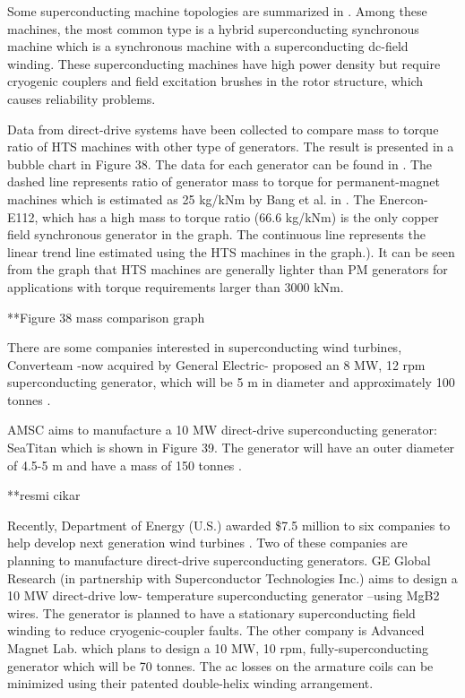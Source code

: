 \documentclass[a4paper, 11pt]{article} %
\begin{document}
Some superconducting machine topologies are summarized in \cite{Kalsi2004a,Gieras2008a}. Among these machines, the most common type is a hybrid superconducting synchronous machine which is a synchronous machine with a superconducting dc-field winding. These superconducting machines have high power density but require cryogenic couplers and field excitation brushes in the rotor structure, which causes reliability problems. 

Data from direct-drive systems have been collected to compare mass to torque ratio of HTS machines with other type of generators. The result is presented in a bubble chart in Figure 38. The data for each generator can be found in \cite{Keysan2011b}. The dashed line represents ratio of generator mass to torque for permanent-magnet machines which is estimated as 25 kg/kNm by Bang et al. in \cite{Bang2008}. The Enercon-E112, which has a high mass to torque ratio (66.6 kg/kNm) is the only copper field synchronous generator in the graph. The continuous line represents the linear trend line estimated using the HTS machines in the graph.). It can be seen from the graph that HTS machines are generally lighter than PM generators for applications with torque requirements larger than 3000 kNm. 

**Figure 38 mass comparison graph

There are some companies interested in superconducting wind turbines, Converteam -now acquired by General Electric- proposed an 8 MW, 12 rpm superconducting generator, which will be 5 m in diameter and approximately 100 tonnes \cite{Lewis2007}. 

AMSC aims to manufacture a 10 MW direct-drive superconducting generator: SeaTitan which is shown in Figure 39. The generator will have an outer diameter of 4.5-5 m and have a mass of 150 tonnes \cite{Snitchler2011}.

**resmi cikar

Recently, Department of Energy (U.S.) awarded \$7.5 million to six companies to help develop next generation wind turbines \cite{dep_energy}. Two of these companies are planning to manufacture direct-drive superconducting generators. GE Global Research (in partnership with Superconductor Technologies Inc.) aims to design a 10 MW direct-drive low- temperature superconducting generator –using MgB2 wires. The generator is planned to have a stationary superconducting field winding to reduce cryogenic-coupler faults. The other company is Advanced Magnet Lab. which plans to design a 10 MW, 10 rpm, fully-superconducting generator which will be 70 tonnes. The ac losses on the armature coils can be minimized using their patented double-helix winding arrangement.
\end{document}
